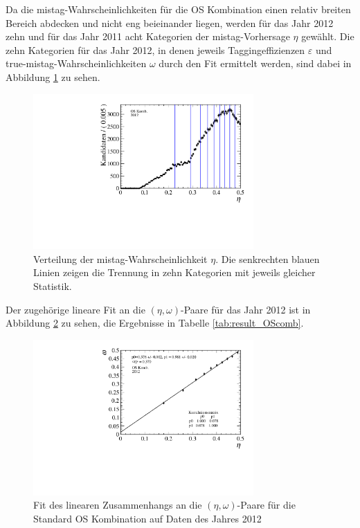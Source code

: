 Da die mistag-Wahrscheinlichkeiten für die OS Kombination einen relativ breiten Bereich abdecken und nicht eng beieinander liegen, werden für das Jahr \num{2012} zehn und für das Jahr \num{2011} acht Kategorien der mistag-Vorhersage $\eta$ gewählt. Die zehn Kategorien für das Jahr \num{2012}, in denen jeweils Taggingeffizienzen $\varepsilon$ und true-mistag-Wahrscheinlichkeiten $\omega$ durch den Fit ermittelt werden, sind dabei in Abbildung \ref{fig:eta_trennung} zu sehen. 
\begin{figure}[htbp]
	\centering
		\includegraphics[width=0.75\textwidth]{fig/eta_trennung.pdf}
	\caption{Verteilung der mistag-Wahrscheinlichkeit $\eta$. Die senkrechten blauen Linien zeigen die Trennung in zehn Kategorien mit jeweils gleicher Statistik.}
	\label{fig:eta_trennung} 
\end{figure}
Der zugehörige lineare Fit an die $(\eta,\omega)$-Paare für das Jahr \num{2012} ist in Abbildung \ref{fig:2012_OScomb} zu sehen, die Ergebnisse in Tabelle \ref{tab:result_OScomb}.
\begin{figure}[htbp]
	\centering
		\includegraphics[width=0.75\textwidth]{fig/2012_OScomb.pdf}
	\caption{Fit des linearen Zusammenhangs an die $(\eta,\omega)$-Paare für die Standard OS Kombination auf Daten des Jahres \num{2012}}
	\label{fig:2012_OScomb} 
\end{figure}
